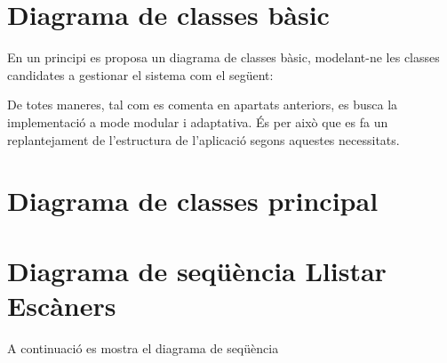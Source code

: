 \documentclass[letterpaper,11pt,catalan]{sphinxmanual}
\begin{document}
\section{Diagrama de classes bàsic}
\label{\detokenize{index:diagrama-de-classes-basic}}
En un principi es proposa un diagrama de classes bàsic, modelant-ne les classes candidates
a gestionar el sistema com el següent:


\begin{DUlineblock}{0em}
\item[] 
\end{DUlineblock}

De totes maneres, tal com es comenta en apartats anteriors, es busca la implementació a mode modular i
adaptativa. És per això que es fa un replantejament de l'estructura de l'aplicació segons aquestes necessitats.

\begin{DUlineblock}{0em}
\item[] 
\item[] 
\item[] 
\end{DUlineblock}


\section{Diagrama de classes principal}
\label{\detokenize{index:diagrama-de-classes-principal}}

\begin{DUlineblock}{0em}
\item[] 
\item[] 
\item[] 
\item[] 
\item[] 
\item[] 
\item[] 
\item[] 
\end{DUlineblock}


\section{Diagrama de seqüència Llistar Escàners}
\label{\detokenize{index:diagrama-de-sequencia-llistar-escaners}}
A continuació es mostra el diagrama de seqüència 
\end{document}

